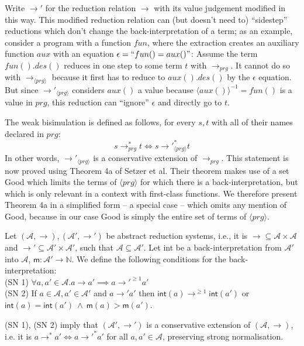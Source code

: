 Write $\longrightarrow'$ for the reduction relation $\longrightarrow$ with its value judgement modified in this way. This modified reduction relation can (but doesn't need to) ``sidestep'' reductions which don't change the back-interpretation of a term; as an example, consider a program with a function $fun$, where the extraction creates an auxiliary function $aux$ with an equation $\epsilon = ``fun() = aux()"$: Assume the term $fun().des()$ reduces in one step to some term $t$ with $\longrightarrow_{prg}$. It cannot do so with $\longrightarrow_{\langle prg \rangle}$ because it first has to reduce to $aux().des()$ by the $\epsilon$ equation. But since $\longrightarrow'_{\langle prg \rangle}$ considers $aux()$ a value because $\langle aux() \rangle^{-1} = fun()$ is a value in $prg$, this reduction can ``ignore'' $\epsilon$ and directly go to $t$.

The weak bisimulation is defined as follows, for every $s,t$ with all of their names declared in $prg$:
\begin{equation}
\label{eq:bisim1}
s \longrightarrow_{prg}^* t \iff s {\longrightarrow'}_{\langle prg \rangle}^* t
\end{equation}
In other words, $\longrightarrow'_{\langle prg \rangle}$ is a conservative extension of $\longrightarrow_{prg}$. This statement is now proved using Theorem 4a of Setzer et al.\cite{setzer14unnesting} Their theorem makes use of a set \textsf{Good} which limits the terms of $\langle prg \rangle$ for which there is a back-interpretation, but which is only relevant in a context with first-class functions. We therefore present Theorem 4a in a simplified form -- a special case -- which omits any mention of \textsf{Good}, because in our case \textsf{Good} is simply the entire set of terms of $\langle prg \rangle$.

\begin{theorem}[Setzer et al.]
\label{thm:setzer4a}
Let $(\mathcal{A}, \longrightarrow), (\mathcal{A}', \longrightarrow')$ be abstract reduction systems, i.e., it is $\longrightarrow \subseteq \mathcal{A} \times \mathcal{A}$ and $\longrightarrow' \subseteq \mathcal{A}' \times \mathcal{A}'$, such that $\mathcal{A} \subseteq \mathcal{A}'$. Let \textsf{int} be a back-interpretation from $\mathcal{A}'$ into $\mathcal{A}$, $\textsf{m} : \mathcal{A}' \to \mathbb{N}$. We define the following conditions for the back-interpretation:\\
(SN 1) $\forall a, a' \in \mathcal{A}. a \longrightarrow a' \implies a {\longrightarrow'}^{\geq 1} a'$\\
(SN 2) If $a \in \mathcal{A}, a' \in \mathcal{A}'$ and $a \longrightarrow' a'$ then $\textsf{int}(a) {\longrightarrow}^{\geq 1} \textsf{int}(a')$ or $\textsf{int}(a) = \textsf{int}(a') ~ \land ~ \textsf{m}(a) > \textsf{m}(a')$.

(SN 1), (SN 2) imply that $(\mathcal{A}', \longrightarrow')$ is a conservative extension of $(\mathcal{A}, \longrightarrow)$, i.e. it is $a \longrightarrow^* a' \iff a {\longrightarrow'}^* a'$ for all $a, a' \in \mathcal{A}$, preserving strong normalisation.
\end{theorem}

